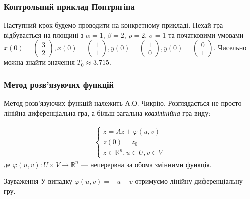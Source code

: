 \documentclass[10pt,pdf]{beamer}
\newcommand{\R}{\mathbb{R}}
\newcommand{\vf}{\varphi}
\renewcommand{\d}[1]{\dot{#1}}
\begin{document}
    \begin{frame}
        \frametitle{Контрольний приклад Понтрягіна}
    
        Наступний крок будемо проводити на конкретному прикладі. Нехай гра відбувається на площині з 
        $\alpha=1$, $\beta=2$, $\rho=2$, $\sigma=1$ та
        початковими умовами $x(0) = \begin{pmatrix}
            3 \\ 2
        \end{pmatrix}, \d{x}(0) = \begin{pmatrix}
            1 \\ 1
        \end{pmatrix}, y(0) = \begin{pmatrix}
            1 \\ 0
        \end{pmatrix}, \d{y}(0) = \begin{pmatrix}
            0 \\ 1
        \end{pmatrix}$. Чисельно можна знайти значення $T_0 \approx 3.715$.
        \begin{center}
            \resizebox{160pt}{!}{
                
            }
        \end{center}
    \end{frame}
    \begin{frame}
        \frametitle{Метод розв’язуючих функцій}
    
        Метод розв’язуючих функцій належить А.О. Чикрію.
        Розглядається не просто лінійна диференціальна гра, а більш загальна
        \emph{квазілінійна} гра виду:
    
        \begin{gather*}
            \begin{cases}
                \d{z} = A z + \vf(u, v) \\
                z(0) = z_0 \\
                z \in \R^n, u \in U, v \in V
            \end{cases}
        \end{gather*}
        де $\vf(u, v) : U\times V \to \R^n$ --- неперервна за обома змінними функція.
        
        \begin{block}{Зауваження}
            У випадку $\vf(u,v) = -u + v$ отримуємо лінійну диференціальну гру.
        \end{block}
    \end{frame}
\end{document}
